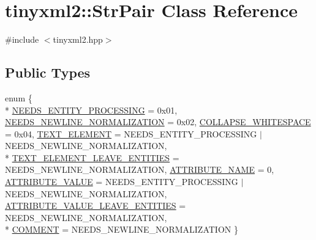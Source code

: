 \hypertarget{classtinyxml2_1_1_str_pair}{\section{tinyxml2\-:\-:Str\-Pair Class Reference}
\label{classtinyxml2_1_1_str_pair}
}


{\ttfamily \#include $<$tinyxml2.\-hpp$>$}

\subsection*{Public Types}
\begin{DoxyCompactItemize}
\item 
enum \{ \\*
\hyperlink{classtinyxml2_1_1_str_pair_a0301ef962e15dd94574431f1c61266c5a4f1e01a55f8efe4ca72c32d454060237}{N\-E\-E\-D\-S\-\_\-\-E\-N\-T\-I\-T\-Y\-\_\-\-P\-R\-O\-C\-E\-S\-S\-I\-N\-G} = 0x01, 
\hyperlink{classtinyxml2_1_1_str_pair_a0301ef962e15dd94574431f1c61266c5a8f2045d56e70745d718672c0da91d0e0}{N\-E\-E\-D\-S\-\_\-\-N\-E\-W\-L\-I\-N\-E\-\_\-\-N\-O\-R\-M\-A\-L\-I\-Z\-A\-T\-I\-O\-N} = 0x02, 
\hyperlink{classtinyxml2_1_1_str_pair_a0301ef962e15dd94574431f1c61266c5ab17a85f396c221811fe49263bf6f843f}{C\-O\-L\-L\-A\-P\-S\-E\-\_\-\-W\-H\-I\-T\-E\-S\-P\-A\-C\-E} = 0x04, 
\hyperlink{classtinyxml2_1_1_str_pair_a0301ef962e15dd94574431f1c61266c5aae519eb5a639858591763aa5fc6cc953}{T\-E\-X\-T\-\_\-\-E\-L\-E\-M\-E\-N\-T} = N\-E\-E\-D\-S\-\_\-\-E\-N\-T\-I\-T\-Y\-\_\-\-P\-R\-O\-C\-E\-S\-S\-I\-N\-G $\vert$ N\-E\-E\-D\-S\-\_\-\-N\-E\-W\-L\-I\-N\-E\-\_\-\-N\-O\-R\-M\-A\-L\-I\-Z\-A\-T\-I\-O\-N, 
\\*
\hyperlink{classtinyxml2_1_1_str_pair_a0301ef962e15dd94574431f1c61266c5a96be48cf899bfeea0aa227f984f1fa63}{T\-E\-X\-T\-\_\-\-E\-L\-E\-M\-E\-N\-T\-\_\-\-L\-E\-A\-V\-E\-\_\-\-E\-N\-T\-I\-T\-I\-E\-S} = N\-E\-E\-D\-S\-\_\-\-N\-E\-W\-L\-I\-N\-E\-\_\-\-N\-O\-R\-M\-A\-L\-I\-Z\-A\-T\-I\-O\-N, 
\hyperlink{classtinyxml2_1_1_str_pair_a0301ef962e15dd94574431f1c61266c5aaab1cbefaa977e6f772b4e2575417aeb}{A\-T\-T\-R\-I\-B\-U\-T\-E\-\_\-\-N\-A\-M\-E} = 0, 
\hyperlink{classtinyxml2_1_1_str_pair_a0301ef962e15dd94574431f1c61266c5a6d72f9ce15f50e8bcd680edf66235dfd}{A\-T\-T\-R\-I\-B\-U\-T\-E\-\_\-\-V\-A\-L\-U\-E} = N\-E\-E\-D\-S\-\_\-\-E\-N\-T\-I\-T\-Y\-\_\-\-P\-R\-O\-C\-E\-S\-S\-I\-N\-G $\vert$ N\-E\-E\-D\-S\-\_\-\-N\-E\-W\-L\-I\-N\-E\-\_\-\-N\-O\-R\-M\-A\-L\-I\-Z\-A\-T\-I\-O\-N, 
\hyperlink{classtinyxml2_1_1_str_pair_a0301ef962e15dd94574431f1c61266c5a2decbd2513ac14f8befa987938326399}{A\-T\-T\-R\-I\-B\-U\-T\-E\-\_\-\-V\-A\-L\-U\-E\-\_\-\-L\-E\-A\-V\-E\-\_\-\-E\-N\-T\-I\-T\-I\-E\-S} = N\-E\-E\-D\-S\-\_\-\-N\-E\-W\-L\-I\-N\-E\-\_\-\-N\-O\-R\-M\-A\-L\-I\-Z\-A\-T\-I\-O\-N, 
\\*
\hyperlink{classtinyxml2_1_1_str_pair_a0301ef962e15dd94574431f1c61266c5a067a6ec90c8beea1cf5992930d93bffa}{C\-O\-M\-M\-E\-N\-T} = N\-E\-E\-D\-S\-\_\-\-N\-E\-W\-L\-I\-N\-E\-\_\-\-N\-O\-R\-M\-A\-L\-I\-Z\-A\-T\-I\-O\-N
 \}
\end{DoxyCompactItemize}
